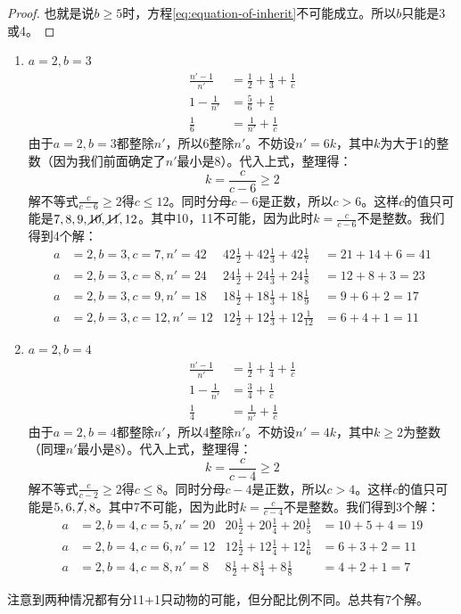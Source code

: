 \documentclass[b5paper]{ctexart}
\begin{document}
\begin{Answer}[ref={ex:fractions}]
{\begin{proof}
也就是说$b \geq 5$时，方程\cref{eq:equation-of-inherit}不可能成立。所以$b$只能是3或4。
\end{proof}

\begin{enumerate}[情况1)]
\item $a = 2, b = 3$
  \begin{align*}
    \frac{n'-1}{n'} &= \frac{1}{2} + \frac{1}{3} + \frac{1}{c} \\
    1 - \frac{1}{n'} &= \frac{5}{6} + \frac{1}{c} \\
    \frac{1}{6} &= \frac{1}{n'} + \frac{1}{c}
  \end{align*}
  由于$a = 2, b = 3$都整除$n'$，所以6整除$n'$。不妨设$n' = 6k$，其中$k$为大于1的整数（因为我们前面确定了$n'$最小是8）。代入上式，整理得：
  \[
  k = \frac{c}{c - 6} \geq 2
  \]
  解不等式$\frac{c}{c - 6} \geq 2$得$c \leq 12$。同时分母$c-6$是正数，所以$c > 6$。这样$c$的值只可能是$7, 8, 9, \cancel{10}, \cancel{11}, 12$。其中10，11不可能，因为此时$k = \frac{c}{c - 6}$不是整数。我们得到4个解：
  \begin{align*}
  a &= 2, b = 3, c = 7, n' = 42 & 42\frac{1}{2} + 42\frac{1}{3} + 42\frac{1}{7} &= 21 + 14 + 6 = 41 \\
  a &= 2, b = 3, c = 8, n' = 24 & 24\frac{1}{2} + 24\frac{1}{3} + 24\frac{1}{8} &= 12 + 8 + 3 = 23 \\
  a &= 2, b = 3, c = 9, n' = 18 & 18\frac{1}{2} + 18\frac{1}{3} + 18\frac{1}{9} &= 9 + 6 + 2 = 17 \\
  a &= 2, b = 3, c = 12, n' = 12 & 12\frac{1}{2} + 12\frac{1}{3} + 12\frac{1}{12} &= 6 + 4 + 1 = 11
  \end{align*}
\item $a = 2, b = 4$
  \begin{align*}
    \frac{n'-1}{n'} &= \frac{1}{2} + \frac{1}{4} + \frac{1}{c} \\
    1 - \frac{1}{n'} &= \frac{3}{4} + \frac{1}{c} \\
    \frac{1}{4} &= \frac{1}{n'} + \frac{1}{c}
  \end{align*}
  由于$a = 2, b = 4$都整除$n'$，所以4整除$n'$。不妨设$n' = 4k$，其中$k \geq 2 $为整数（同理$n'$最小是8）。代入上式，整理得：
  \[
  k = \frac{c}{c - 4} \geq 2
  \]
  解不等式$\frac{c}{c - 2} \geq 2$得$c \leq 8$。同时分母$c-4$是正数，所以$c > 4$。这样$c$的值只可能是$5, 6, \cancel{7}, 8$。其中7不可能，因为此时$k = \frac{c}{c - 4}$不是整数。我们得到3个解：
  \begin{align*}
  a &= 2, b = 4, c = 5, n' = 20 & 20\frac{1}{2} + 20\frac{1}{4} + 20\frac{1}{5} &= 10 + 5 + 4 = 19 \\
  a &= 2, b = 4, c = 6, n' = 12 & 12\frac{1}{2} + 12\frac{1}{4} + 12\frac{1}{6} &= 6 + 3 + 2 = 11 \\
  a &= 2, b = 4, c = 8, n' = 8 & 8\frac{1}{2} + 8\frac{1}{4} + 8\frac{1}{8} &= 4 + 2 + 1 = 7
  \end{align*}
\end{enumerate}
注意到两种情况都有分11+1只动物的可能，但分配比例不同。总共有7个解。

}
\end{Answer}
\end{document}
